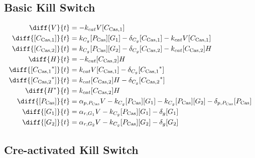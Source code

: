 \subsection{Basic Kill Switch}
\label{s:Basic_kill_switch}

\begin{align}
\diff{\vectorGen{}}{t} & = - \casCutRate{{}}\vectorGen{}\conc{\cplx{\cas}{1}}\\
\diff{\conc{\cplx{\cas}{1}}}{t} & =  \gRnaBind{}\conc{\proSp{\cas{}}}\conc{\gRna{1}} - \casCompDegradeRate{}\conc{\cplx{\cas}{1}} - \casCutRate{{}}\vectorGen{}\conc{\cplx{\cas}{1}}\\
\diff{\conc{\cplx{\cas}{2}}}{t} & =  \gRnaBind{}\conc{\proSp{\cas{}}}\conc{\gRna{2}} - \casCompDegradeRate{}\conc{\cplx{\cas}{2}} - \casCutRate{{}}\conc{\cplx{\cas}{2}}\hostGen{}\\
\diff{\hostGen{}}{t} & = - \casCutRate{{}}\conc{\cplx{\cas}{2}}\hostGen{}\\
\diff{\conc{\bound{\cplx{\cas}{1}}}}{t} & =  \casCutRate{{}}\vectorGen{}\conc{\cplx{\cas}{1}} - \casCompDegradeRate{}\conc{\bound{\cplx{\cas}{1}}}\\
\diff{\conc{\bound{\cplx{\cas}{2}}}}{t} & =  \casCutRate{{}}\conc{\cplx{\cas}{2}}\hostGen{} - \casCompDegradeRate{}\conc{\bound{\cplx{\cas}{2}}}\\
\diff{\edited{\hostGen{}}}{t} & =  \casCutRate{{}}\conc{\cplx{\cas}{2}}\hostGen{}\\
\diff{\conc{\proSp{\cas{}}}}{t} & =  \txtlRate{\proSp{\cas{}}}\vectorGen{} - \gRnaBind{}\conc{\proSp{\cas{}}}\conc{\gRna{1}} - \gRnaBind{}\conc{\proSp{\cas{}}}\conc{\gRna{2}} - \proDegradeRate{\proSp{\cas{}}}\conc{\proSp{\cas{}}}\\
\diff{\conc{\gRna{1}}}{t} & =  \txRate{\gRna{1}}\vectorGen{} - \gRnaBind{}\conc{\proSp{\cas{}}}\conc{\gRna{1}} - \rnaDegradeRate{}\conc{\gRna{1}}\\
\diff{\conc{\gRna{2}}}{t} & =  \txRate{\gRna{2}}\vectorGen{} - \gRnaBind{}\conc{\proSp{\cas{}}}\conc{\gRna{2}} - \rnaDegradeRate{}\conc{\gRna{2}}
\end{align}

\subsection{Cre-activated Kill Switch}
\label{s:Cre_delayed_kill_switch}


